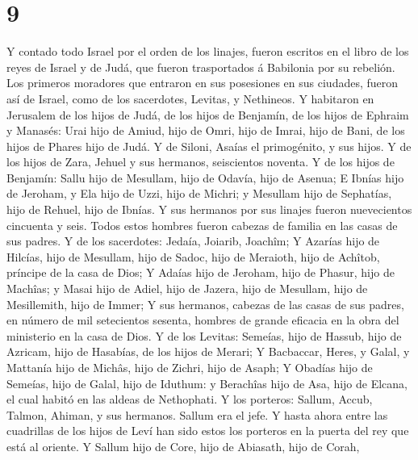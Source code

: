 \hypertarget{section-8}{%
\section{9}\label{section-8}}

 Y contado todo Israel por el orden de los linajes, fueron
escritos en el libro de los reyes de Israel y de Judá, que fueron
trasportados á Babilonia por su rebelión.  Los primeros
moradores que entraron en sus posesiones en sus ciudades, fueron así de
Israel, como de los sacerdotes, Levitas, y Nethineos.  Y
habitaron en Jerusalem de los hijos de Judá, de los hijos de Benjamín,
de los hijos de Ephraim y Manasés:  Urai hijo de Amiud,
hijo de Omri, hijo de Imrai, hijo de Bani, de los hijos de Phares hijo
de Judá.  Y de Siloni, Asaías el primogénito, y sus hijos.
 Y de los hijos de Zara, Jehuel y sus hermanos,
seiscientos noventa.  Y de los hijos de Benjamín: Sallu
hijo de Mesullam, hijo de Odavía, hijo de Asenua;  E
Ibnías hijo de Jeroham, y Ela hijo de Uzzi, hijo de Michri; y Mesullam
hijo de Sephatías, hijo de Rehuel, hijo de Ibnías.  Y sus
hermanos por sus linajes fueron nuevecientos cincuenta y seis. Todos
estos hombres fueron cabezas de familia en las casas de sus padres.
 Y de los sacerdotes: Jedaía, Joiarib, Joachîm;
 Y Azarías hijo de Hilcías, hijo de Mesullam, hijo de
Sadoc, hijo de Meraioth, hijo de Achîtob, príncipe de la casa de Dios;
 Y Adaías hijo de Jeroham, hijo de Phasur, hijo de
Machîas; y Masai hijo de Adiel, hijo de Jazera, hijo de Mesullam, hijo
de Mesillemith, hijo de Immer;  Y sus hermanos, cabezas
de las casas de sus padres, en número de mil setecientos sesenta,
hombres de grande eficacia en la obra del ministerio en la casa de Dios.
 Y de los Levitas: Semeías, hijo de Hassub, hijo de
Azricam, hijo de Hasabías, de los hijos de Merari;  Y
Bacbaccar, Heres, y Galal, y Mattanía hijo de Michâs, hijo de Zichri,
hijo de Asaph;  Y Obadías hijo de Semeías, hijo de Galal,
hijo de Iduthum: y Berachîas hijo de Asa, hijo de Elcana, el cual habitó
en las aldeas de Nethophati.  Y los porteros: Sallum,
Accub, Talmon, Ahiman, y sus hermanos. Sallum era el jefe.
 Y hasta ahora entre las cuadrillas de los hijos de Leví
han sido estos los porteros en la puerta del rey que está al oriente.
 Y Sallum hijo de Core, hijo de Abiasath, hijo de Corah,
